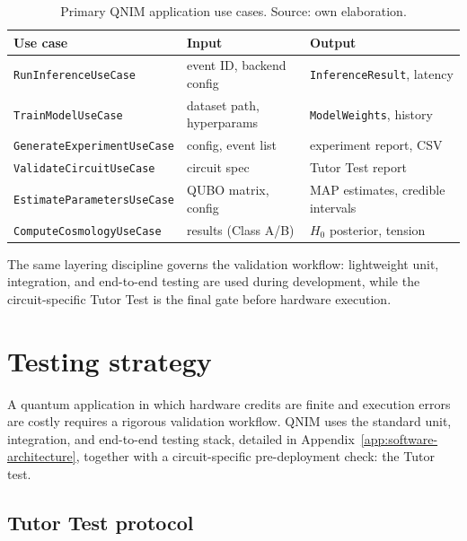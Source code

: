 \documentclass[11pt,a4paper, english]{book}
\theoremstyle{plain}
\theoremstyle{definition}
\numberwithin{equation}{chapter}
\numberwithin{figure}{chapter}
\numberwithin{table}{chapter}
\begin{document}
\begin{table}[h]
\centering

\small
\begin{tabular}{@{}lp{4cm}p{4cm}@{}}
\toprule
\textbf{Use case} & \textbf{Input} & \textbf{Output} \\
\midrule
\texttt{RunInferenceUseCase} & event ID, backend config & \texttt{InferenceResult}, latency \\
\texttt{TrainModelUseCase} & dataset path, hyperparams & \texttt{ModelWeights}, history \\
\texttt{GenerateExperimentUseCase} & config, event list & experiment report, CSV \\
\texttt{ValidateCircuitUseCase} & circuit spec & Tutor Test report \\
\texttt{EstimateParametersUseCase} & QUBO matrix, config & MAP estimates, credible intervals \\
\texttt{ComputeCosmologyUseCase} & results (Class A/B) & $H_0$ posterior, tension \\
\bottomrule
\end{tabular}
\caption[Primary QNIM application use cases.]{Primary QNIM application use cases. Source: own elaboration.}
\label{tab:use_cases}
\vspace{2pt}
\footnotesize
\normalsize

\end{table}

The same layering discipline governs the validation workflow: lightweight unit, integration, and end-to-end testing are used during development, while the circuit-specific Tutor Test is the final gate before hardware execution.

\section{Testing strategy}
\label{sec:testing}
A quantum application in which hardware credits are finite and execution errors are costly requires a rigorous validation workflow. QNIM uses the standard unit, integration, and end-to-end testing stack, detailed in Appendix~\ref{app:software-architecture}, together with a circuit-specific pre-deployment check: the Tutor test.

\subsection{Tutor Test protocol}
\label{subsec:tutor_test}
\end{document}
